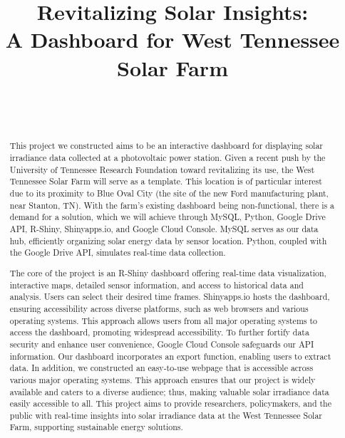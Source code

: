 \documentclass{sigchi}
\def\plaintitle{Revitalizing Solar Insights:\\ A Dashboard for West Tennessee Solar Farm}
\begin{document}
\title{\plaintitle}

\author{%
  \\
  \\
}

\maketitle
\begin{abstract}
This project we constructed aims to be an interactive dashboard for displaying solar irradiance data collected at a photovoltaic power station. Given a recent push by the University of Tennessee Research Foundation toward revitalizing its use, the West Tennessee Solar Farm will serve as a template. This location is of particular interest due to its proximity to Blue Oval City (the site of the new Ford manufacturing plant, near Stanton, TN). With the farm’s existing dashboard being non-functional, there is a demand for a solution, which we will achieve through MySQL, Python, Google Drive API, R-Shiny, Shinyapps.io, and Google Cloud Console.
MySQL serves as our data hub, efficiently organizing solar energy data by sensor location. Python, coupled with the Google Drive API, simulates real-time data collection. 

The core of the project is an R-Shiny dashboard offering real-time data visualization, interactive maps, detailed sensor information, and access to historical data and analysis. Users can select their desired time frames. Shinyapps.io hosts the dashboard, ensuring accessibility across diverse platforms, such as web browsers and various operating systems. This approach allows users from all major operating systems to access the dashboard, promoting widespread accessibility. To further fortify data security and enhance user convenience, Google Cloud Console safeguards our API information.
Our dashboard incorporates an export function, enabling users to extract data. In addition, we constructed an easy-to-use webpage that is accessible across various major operating systems. This approach ensures that our project is widely available and caters to a diverse audience; thus, making valuable solar irradiance data easily accessible to all. This project aims to provide researchers, policymakers, and the public with real-time insights into solar irradiance data at the West Tennessee Solar Farm, supporting sustainable energy solutions.


\end{abstract}
\end{document}

